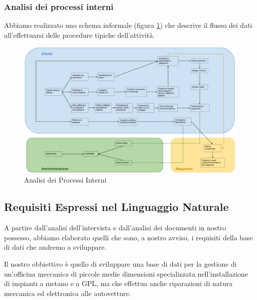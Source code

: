 		\subsubsection{Analisi dei processi interni}
			
			Abbiamo realizzato uno schema informale (figura \ref{fig:internal_processes}) che descrive il flusso dei dati all'effettuarsi delle procedure tipiche dell'attività.
			
			
			\begin{figure}
				\centering
				\includegraphics[width=22cm]{images/internal_processes.png}
				\caption{Analisi dei Processi Interni}
				\label{fig:internal_processes}
			\end{figure}
		
	\subsection{Requisiti Espressi nel Linguaggio Naturale}
	
		A partire dall’analisi dell’intervista e dall’analisi dei documenti in nostro possesso, abbiamo elaborato quelli che sono, a nostro avviso, i requisiti della base di dati che andremo a sviluppare.
		
		Il nostro obbiettivo è quello di sviluppare una base di dati per la gestione di un’officina meccanica di piccole medie dimensioni specializzata nell’installazione di impianti a metano e a GPL, ma che effettua anche riparazioni di natura meccanica ed elettronica alle autovetture.
		
